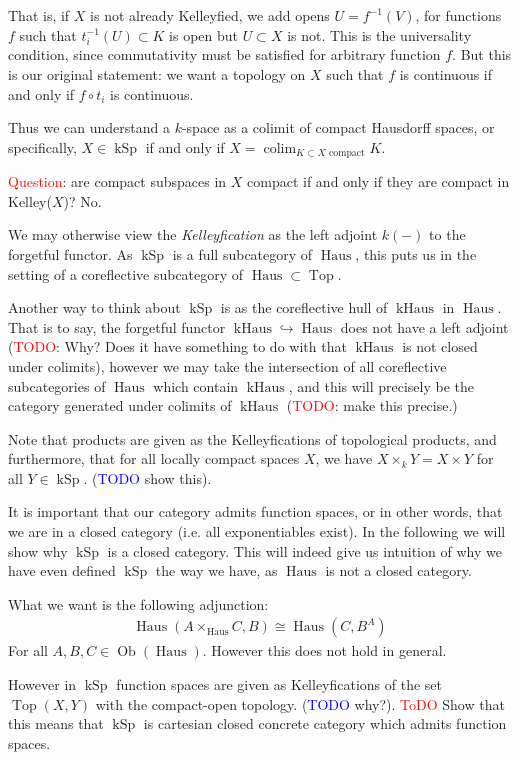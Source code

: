 \documentclass[12pt,a4paper]{article}
\DeclareMathOperator{\colim}{colim}
\DeclareMathOperator{\Top}{Top}
\DeclareMathOperator{\Ob}{Ob}
\DeclareMathOperator{\kSp}{kSp}
\DeclareMathOperator{\kHaus}{kHaus}
\DeclareMathOperator{\Haus}{Haus}
\begin{document}
That is, if $X$ is not already Kelleyfied, we add opens $U = f^{-1}(V)$, for functions $f$ such that  $t_i^{-1}(U) \subset K$ is open  but $U \subset X$ is not. This is the universality condition, since commutativity must be satisfied for arbitrary function $f$. But this is our original statement: we want a topology on $X$ such that $f$ is continuous if and only if $f \circ t_i$ is continuous. 

Thus we can understand a $k$-space as a colimit of compact Hausdorff spaces, or specifically, $X \in \kSp$ if and only if $X = \colim_{K \subset X \text{ compact}}K$.

\textcolor{red}{Question}: are compact subspaces in $X$ compact if and only if they are compact in Kelley($X$)? No.

We may otherwise view the \emph{Kelleyfication} as the left adjoint $k(-)$ to the forgetful functor. As $\kSp$ is a full subcategory of $\Haus$, this puts us in the setting of a coreflective subcategory of $\Haus \subset \Top$. 

Another way to think about $\kSp$ is as the coreflective hull of $\kHaus$ in $\Haus$. That is to say, the forgetful functor $\kHaus \hookrightarrow \Haus$ does not have a left adjoint (\textcolor{red}{TODO}: Why? Does it have something to do with that $\kHaus$ is not closed under colimits), however we may take the intersection of all coreflective subcategories of $\Haus$ which contain $\kHaus$, and this will precisely be the category generated under colimits of $\kHaus$  (\textcolor{red}{TODO}: make this precise.)

Note that products are given as the Kelleyfications of topological  products, and furthermore, that for all locally compact spaces $X$, we have $X \times_k Y = X \times Y$ for all $Y \in \kSp$. (\textcolor{blue}{TODO} show this).

It is important that our category admits function spaces, or in other words, that we are in a closed category (i.e. all exponentiables exist). In the following we will show why $\kSp$ is a closed category. This will indeed give us intuition of why we have even defined $\kSp$ the way we have, as $\Haus $ is not a closed category.  

What we want is the following adjunction:
\begin{align*}
	\Haus(A \times_{\Haus}C, B) \cong \Haus(C, B^A)
\end{align*}
For all $A, B, C \in \Ob(\Haus)$. However this does not hold in general. 

However in $\kSp$ function spaces are given as Kelleyfications of the set $\Top(X,Y)$ with the compact-open topology. (\textcolor{blue}{TODO} why?).
\textcolor{red}{ToDO} Show that this means that $\kSp$ is cartesian closed concrete category which admits function spaces.
\end{document}

